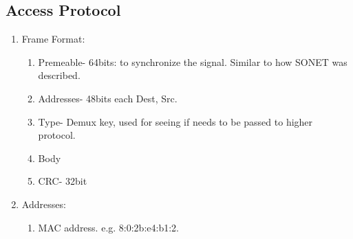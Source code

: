 \documentclass[12pt]{book}
\begin{document}
\subsection{Access Protocol}
\begin{enumerate}
    \item Frame Format:
    \begin{enumerate}
        \item Premeable- 64bits: to synchronize the signal. Similar to how SONET was described.
        \item Addresses- 48bits each Dest, Src.
        \item Type- Demux key, used for seeing if needs to be passed to higher protocol.
        \item Body
        \item CRC- 32bit
    \end{enumerate}
    \item Addresses:
    \begin{enumerate}
        \item MAC address. e.g. 8:0:2b:e4:b1:2.
    \end{enumerate}
\end{enumerate}
\end{document}
